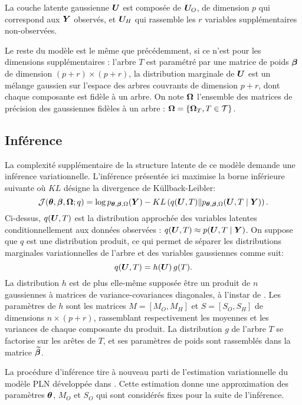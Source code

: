 La couche latente gaussienne ${\boldsymbol{U}}$ est composée de ${\boldsymbol{U}}_O$, de dimension $p$ qui correspond aux ${\boldsymbol{Y}}$ observés, et ${\boldsymbol{U}}_H$ qui rassemble les $r$ variables supplémentaires non-observées. 

Le reste du modèle est le même que précédemment, si ce n'est pour les dimensions supplémentaires : l'arbre $T$  est paramétré par une matrice de poids ${\boldsymbol{\beta}}$ de dimension $(p+r)\times (p+r)$, la distribution marginale de ${\boldsymbol{U}}$ est un mélange gaussien sur l'espace des arbres couvrants de dimension $p+r$, dont chaque composante est fidèle à un arbre. On note ${\boldsymbol{\Omega}}$ l'ensemble des matrices de précision des gaussiennes fidèles à un arbre : ${\boldsymbol{\Omega}} = \{{\boldsymbol{\Omega}}_T, T\in \mathcal{T}\}$. 
 
\subsection*{Inférence}
La complexité supplémentaire de la structure latente de ce modèle demande une inférence variationnelle. L'inférence présentée ici maximise la borne inférieure suivante où $KL$ désigne la divergence de Küllback-Leibler:
$${\mathcal{J}}({\boldsymbol{\theta}}, {\boldsymbol{\beta}}, {\boldsymbol{\Omega}}; q)= \log p_{{\boldsymbol{\theta}}, {\boldsymbol{\beta}}, \Omega}({\boldsymbol{Y}}) - KL\left(q({\boldsymbol{U}}, T) \| p_{{\boldsymbol{\theta}}, {\boldsymbol{\beta}}, \Omega}({\boldsymbol{U}}, T \mid {\boldsymbol{Y}}) \right).$$
Ci-dessus, $q({\boldsymbol{U}}, T)$ est la distribution approchée des variables latentes conditionnellement aux données observées : $q({\boldsymbol{U}}, T)\approx p({\boldsymbol{U}}, T \mid {\boldsymbol{Y}})$. On suppose que $q$ est une distribution produit, ce qui permet de séparer les distributions marginales variationnelles de l'arbre et des variables gaussiennes comme suit:
$$q({\boldsymbol{U}}, T) = h({\boldsymbol{U}}) \,g(T).$$
La distribution $h$ est de plus elle-même supposée être un produit de $n$ gaussiennes à matrices de variance-covariances diagonales, à l'instar de \citet{CMR18}. Les paramètres de $h$ sont les matrices $M=[M_O, M_H]$ et $S=[S_O, S_H]$ de dimensions $n\times (p+r)$, rassemblant respectivement les moyennes et les variances de chaque composante du produit.
La distribution $g$ de l'arbre $T$ se factorise sur les arêtes de $T$, et ses paramètres de poids sont rassemblés dans la matrice $\widetilde{{\boldsymbol{\beta}}}$.

La procédure d'inférence tire à nouveau parti de l'estimation variationnelle du modèle PLN développée dans \citet{CMR18}. Cette estimation donne une approximation des paramètres ${\boldsymbol{\theta}}$, $M_O$ et $S_O$ qui sont considérés fixes pour la suite de l'inférence.

